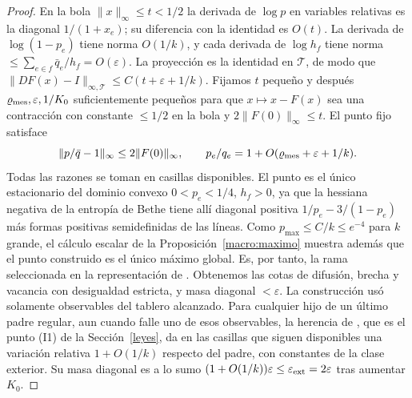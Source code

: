 \begin{proof}
En la bola $\|x\|_\infty\le t<1/2$ la derivada de $\log p$ en variables relativas es la diagonal
$1/(1+x_e)$; su diferencia con la identidad es $O(t)$. La derivada de $\log(1-p_e)$ tiene norma
$O(1/k)$, y cada derivada de $\log h_f$ tiene norma $\le\sum_{e\in f}\bar q_e/h_f=O(\varepsilon)$. La
proyección es la identidad en $\mathcal T$, de modo que $\|DF(x)-I\|_{\infty,\mathcal T}\le
C(t+\varepsilon+1/k)$. Fijamos $t$ pequeño y después $\varrho_{\rm mes},\varepsilon,1/K_0$ suficientemente
pequeños
para que $x\mapsto x-F(x)$ sea una contracción con constante $\le1/2$ en la bola y
$2\|F(0)\|_\infty\le t$. El punto fijo satisface
\[
 \|p/\bar q-1\|_\infty\le 2\|F(0)\|_\infty,\qquad
 p_e/q_e=1+O(\varrho_{\rm mes}+\varepsilon+1/k).
\]
Todas las razones se toman en casillas disponibles. El punto es el único estacionario del dominio
convexo $0<p_e<1/4$, $h_f>0$, ya que la hessiana negativa de la entropía de Bethe tiene allí diagonal
positiva
$1/p_e-3/(1-p_e)$ más formas positivas semidefinidas de las líneas. Como $p_{\max}\le C/k\le e^{-4}$
para $k$ grande,
el cálculo escalar de la Proposición~\ref{macro:maximo} muestra además que el punto construido es
el único máximo global. Es, por tanto, la rama seleccionada en la representación de
\cite[Teorema~8.1 y el párrafo que lo sigue]{pred}. Obtenemos las cotas de difusión, brecha y
vacancia con desigualdad estricta, y masa diagonal $<\varepsilon$. La construcción usó solamente
observables del tablero alcanzado. Para cualquier hijo de un último padre regular, aun cuando falle
uno de esos observables, la herencia de \cite[Secciones~6.5 y~8.2--8.3]{pred}, que es el punto (I1)
de la Sección~\ref{leyes}, da en las casillas que siguen disponibles una variación relativa
$1+O(1/k)$ respecto del padre, con constantes de la clase exterior. Su masa diagonal es a lo sumo
$(1+O(1/k))\varepsilon\le\varepsilon_{\rm ext}=2\varepsilon$ tras aumentar $K_0$.
\end{proof}
